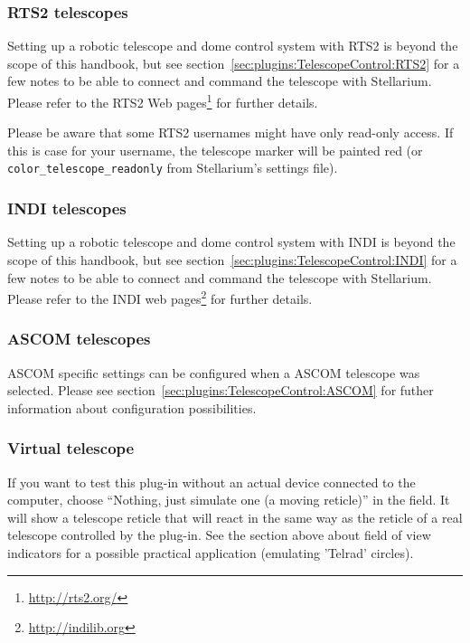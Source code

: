 \subsubsection{RTS2 telescopes}
Setting up a robotic telescope and dome control system with RTS2 
is beyond the scope of this handbook, but see section~\ref{sec:plugins:TelescopeControl:RTS2} 
for a few notes to be able to connect and command the telescope with Stellarium.
Please refer to the RTS2 Web pages\footnote{\url{http://rts2.org/}} for further details.

Please be aware that some RTS2 usernames might have only read-only access. If this is
case for your username, the telescope marker will be painted red (or
\texttt{color\_telescope\_readonly} from Stellarium's settings file).

\subsubsection{INDI telescopes}
Setting up a robotic telescope and dome control system with INDI 
is beyond the scope of this handbook, but see section~\ref{sec:plugins:TelescopeControl:INDI} 
for a few notes to be able to connect and command the telescope with Stellarium.
Please refer to the INDI web pages\footnote{\url{http://indilib.org}} for further details.

\subsubsection{ASCOM telescopes}
ASCOM specific settings can be configured when a ASCOM telescope was selected.
Please see section~\ref{sec:plugins:TelescopeControl:ASCOM} for futher information about
configuration possibilities.

\subsubsection{Virtual telescope}
If you want to test this plug-in without an actual device connected to
the computer, choose ``Nothing, just simulate one (a moving reticle)'' in
the  field. It will show a telescope reticle
that will react in the same way as the reticle of a real telescope
controlled by the plug-in.  See the section above about field of view
indicators for a possible practical application (emulating 'Telrad'
circles).  



